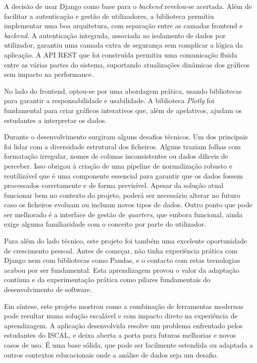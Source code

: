 A decisão de usar Django como base para o \textit{backend} revelou-se acertada. Além de facilitar a autenticação e gestão de utilizadores, a  biblioteca permitiu implementar uma boa arquitetura, com separação entre as camadas frontend e \textit{backend}. A autenticação integrada, associada ao isolamento de dados por utilizador, garantiu uma camada extra de segurança sem complicar a lógica da aplicação. A API REST que foi construída permitiu uma comunicação fluida entre as várias partes do sistema, suportando atualizações dinâmicas dos gráficos sem impacto na performance.

No lado do frontend, optou-se por uma abordagem prática, usando bibliotecas para garantir a responsabilidade e usabilidade. A biblioteca \textit{Plotly} foi fundamental para criar gráficos interativos que, além de apelativos, ajudam os estudantes a interpretar os dados.

Durante o desenvolvimento surgiram alguns desafios técnicos. Um dos principais foi lidar com a diversidade estrutural dos ficheiros. Alguns traziam folhas com formatação irregular, nomes de colunas inconsistentes ou dados dificeis de perceber. Isso obrigou à criação de uma pipeline de normalização robusto e reutilizável que é uma componente essencial para garantir que os dados fossem processados corretamente e de forma previsível. Apesar da solução atual funcionar bem no contexto do projeto, poderá ser necessário alterar no futuro caso os ficheiros evoluam ou incluam novos tipos de dados. Outro ponto que pode ser melhorado é a interface de gestão de \textit{quarters}, que embora funcional, ainda exige alguma familiaridade com o conceito por parte do utilizador.

Para além do lado técnico, este projeto foi também uma excelente oportunidade de crescimento pessoal. Antes de começar, não tinha experiência prática com Django nem com bibliotecas como Pandas, e o contacto com estas tecnologias acabou por ser fundamental. Esta aprendizagem provou o valor da adaptação contínua e da experimentação prática como pilares fundamentais do desenvolvimento de software.

Em síntese, este projeto mostrou como a combinação de ferramentas modernas pode resultar numa solução escalável e com impacto direto na experiência de aprendizagem. A aplicação desenvolvida resolve um problema enfrentado pelos estudantes do ISCAL, e deixa aberta a porta para futuras melhorias e novos casos de uso. É uma base sólida, que pode ser facilmente estendida ou adaptada a outros contextos educacionais onde a análise de dados seja um desafio.


